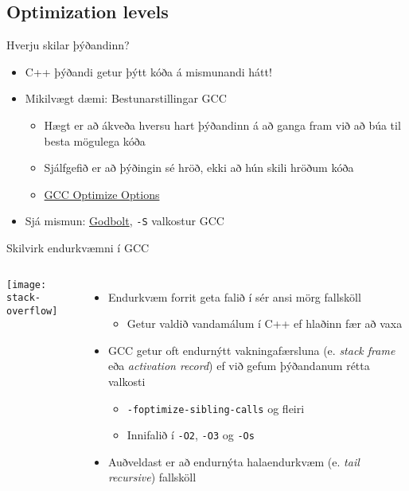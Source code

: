 \documentclass{beamer}
\begin{document}
\subsection{Optimization levels}

\begin{frame}{Hverju skilar þýðandinn?}
	\begin{itemize}
		\item C++ þýðandi getur þýtt kóða á mismunandi hátt!
		\item Mikilvægt dæmi: Bestunarstillingar GCC
		      \begin{itemize}
			      \item Hægt er að ákveða hversu hart þýðandinn á að ganga fram við að búa til besta mögulega kóða
			      \item Sjálfgefið er að þýðingin sé hröð, ekki að hún skili hröðum kóða
			      \item \href{https://gcc.gnu.org/onlinedocs/gcc/Optimize-Options.html}{GCC Optimize Options}
		      \end{itemize}
		\item Sjá mismun: \href{http://godbolt.org/}{Godbolt}, \texttt{-S} valkostur GCC
	\end{itemize}
\end{frame}

\begin{frame}{Skilvirk endurkvæmni í GCC}
	\begin{columns}
		\begin{center}
			\texttt{[image: stack-overflow]}
		\end{center}
		\begin{itemize}
			\item Endurkvæm forrit geta falið í sér ansi mörg fallsköll
			      \begin{itemize}
				      \item Getur valdið vandamálum í C++ ef hlaðinn fær að vaxa
			      \end{itemize}
			\item GCC getur oft endurnýtt vakningafærsluna (e. \emph{stack frame} eða \emph{activation record}) ef við gefum þýðandanum rétta valkosti
			      \begin{itemize}
				      \item \texttt{-foptimize-sibling-calls} og fleiri
				      \item Innifalið í \texttt{-O2}, \texttt{-O3} og \texttt{-Os}
			      \end{itemize}
			\item Auðveldast er að endurnýta halaendurkvæm (e. \emph{tail recursive}) fallsköll
		\end{itemize}
	\end{columns}
\end{frame}
\end{document}
